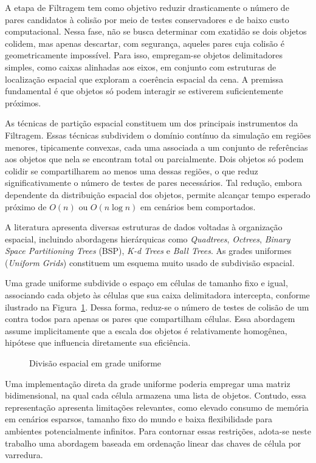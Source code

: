 A etapa de Filtragem tem como objetivo reduzir drasticamente o número de pares candidatos à colisão por meio de testes conservadores e de baixo custo computacional. Nessa fase, não se busca determinar com exatidão se dois objetos colidem, mas apenas descartar, com segurança, aqueles pares cuja colisão é geometricamente impossível. Para isso, empregam-se objetos delimitadores simples, como caixas alinhadas aos eixos, em conjunto com estruturas de localização espacial que exploram a coerência espacial da cena. A premissa fundamental é que objetos só podem interagir se estiverem suficientemente próximos.

As técnicas de partição espacial constituem um dos principais instrumentos da Filtragem. Essas técnicas subdividem o domínio contínuo da simulação em regiões menores, tipicamente convexas, cada uma associada a um conjunto de referências aos objetos que nela se encontram total ou parcialmente. Dois objetos só podem colidir se compartilharem ao menos uma dessas regiões, o que reduz significativamente o número de testes de pares necessários. Tal redução, embora dependente da distribuição espacial dos objetos, permite alcançar tempo esperado próximo de $O(n)$ ou $O(n \log n)$ em cenários bem comportados.

A literatura apresenta diversas estruturas de dados voltadas à organização espacial, incluindo abordagens hierárquicas como \textit{Quadtrees}, \textit{Octrees}, \textit{Binary Space Partitioning Trees} (BSP), \textit{K-d Trees} e \textit{Ball Trees}. As grades uniformes (\textit{Uniform Grids}) constituem um esquema muito usado de subdivisão espacial. 

Uma grade uniforme subdivide o espaço em células de tamanho fixo e igual, associando cada objeto às células que sua caixa delimitadora intercepta, conforme ilustrado na Figura~\ref{fig:grade-uniforme}. Dessa forma, reduz-se o número de testes de colisão de um contra todos para apenas os pares que compartilham células. Essa abordagem assume implicitamente que a escala dos objetos é relativamente homogênea, hipótese que influencia diretamente sua eficiência.

\begin{figure}[htb]
	\caption{Divisão espacial em grade uniforme}
	\centering
	
	\label{fig:grade-uniforme}
\end{figure}

Uma implementação direta da grade uniforme poderia empregar uma matriz bidimensional, na qual cada célula armazena uma lista de objetos. Contudo, essa representação apresenta limitações relevantes, como elevado consumo de memória em cenários esparsos, tamanho fixo do mundo e baixa flexibilidade para ambientes potencialmente infinitos. Para contornar essas restrições, adota-se neste trabalho uma abordagem baseada em ordenação linear das chaves de célula por varredura.

